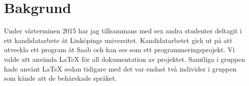 \section{Bakgrund}
Under vårterminen 2015 har jag tillsammans med sex andra studenter deltagit i ett kandidatarbete åt Linköpings universitet. Kandidatarbetet gick ut på att utveckla ett program åt Saab och kan ses som ett programmeringsprojekt. Vi valde att använda {\LaTeX} för all dokumentation av projektet. Samtliga i gruppen hade använt {\LaTeX} sedan tidigare med det var endast två individer i gruppen som kände att de behärskade språket.   
